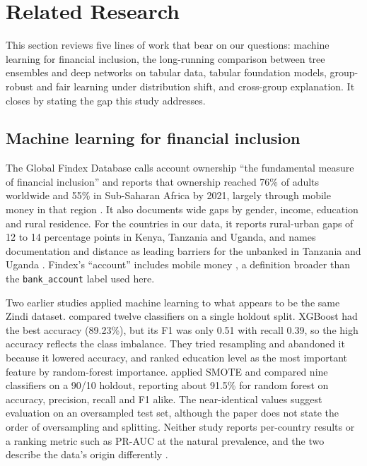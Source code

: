 \documentclass[11pt]{article}
\begin{document}
\section{Related Research}
\label{sec:related}

This section reviews five lines of work that bear on our questions: machine learning for financial inclusion, the long-running comparison between tree ensembles and deep networks on tabular data, tabular foundation models, group-robust and fair learning under distribution shift, and cross-group explanation. It closes by stating the gap this study addresses.

\subsection{Machine learning for financial inclusion}

The Global Findex Database calls account ownership ``the fundamental measure of financial inclusion'' and reports that ownership reached 76\% of adults worldwide and 55\% in Sub-Saharan Africa by 2021, largely through mobile money in that region \citep[pp.~20, 27]{demirguckunt2022findex}. It also documents wide gaps by gender, income, education and rural residence. For the countries in our data, it reports rural-urban gaps of 12 to 14 percentage points in Kenya, Tanzania and Uganda, and names documentation and distance as leading barriers for the unbanked in Tanzania and Uganda \citep[pp.~47, 53--54]{demirguckunt2022findex}. Findex's ``account'' includes mobile money \citep[p.~33]{demirguckunt2022findex}, a definition broader than the \texttt{bank\_account} label used here.

Two earlier studies applied machine learning to what appears to be the same Zindi dataset. \citet{ismail2021using} compared twelve classifiers on a single holdout split. XGBoost had the best accuracy (89.23\%), but its F1 was only 0.51 with recall 0.39, so the high accuracy reflects the class imbalance. They tried resampling and abandoned it because it lowered accuracy, and ranked education level as the most important feature by random-forest importance. \citet{balde2022efficient} applied SMOTE and compared nine classifiers on a 90/10 holdout, reporting about 91.5\% for random forest on accuracy, precision, recall and F1 alike. The near-identical values suggest evaluation on an oversampled test set, although the paper does not state the order of oversampling and splitting. Neither study reports per-country results or a ranking metric such as PR-AUC at the natural prevalence, and the two describe the data's origin differently \citep{ismail2021using, balde2022efficient}.
\end{document}
